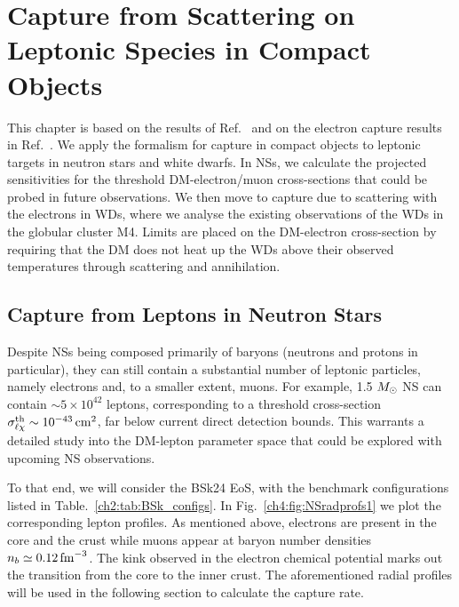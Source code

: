 \graphicspath{{img/capture_leptons/}}

\chapter{Capture from Scattering on Leptonic Species in Compact Objects}
\label{chapter:capture_leptons}

\begin{synopsis}
This chapter is based on the results of Ref.~\cite{Bell:2020lmm_mar_ImprovedTreatmentDark} and on the electron capture results in Ref.~\cite{Bell:2021fye_oct_Improvedtreatmentdark}. We apply the formalism for capture in compact objects to leptonic targets in neutron stars and white dwarfs. In NSs, we calculate the projected sensitivities for the threshold DM-electron/muon cross-sections that could be probed in future observations. We then move to capture due to scattering with the electrons in WDs, where we analyse the existing observations of the WDs in the globular cluster M4. Limits are placed on the DM-electron cross-section by requiring that the DM does not heat up the WDs above their observed temperatures through scattering and annihilation.
\end{synopsis}



\section{Capture from Leptons in Neutron Stars}
\label{ch4:sec:lep_NS}
Despite NSs being composed primarily of baryons (neutrons and protons in particular), they can still contain a substantial number of leptonic particles, namely electrons and, to a smaller extent, muons. For example, 1.5 $M_\odot$ NS can contain $\sim 5\times 10^42$ leptons, corresponding to a threshold cross-section $\sigma^{\rm th}_{\ell\chi}\sim 10^{-43}{\rm \,cm}^2$, far below current direct detection bounds. This warrants a detailed study into the DM-lepton parameter space that could be explored with upcoming NS observations. 

To that end, we will consider the BSk24 EoS, with the benchmark configurations listed in Table.~\ref{ch2:tab:BSk_configs}.
In Fig.~\ref{ch4:fig:NSradprofs1} we plot the corresponding lepton profiles.
As mentioned above, electrons are present in the core and the crust while muons appear at baryon number densities $n_b\simeq 0.12{\rm \,fm}^{-3}$. The kink observed in the electron chemical potential marks out the transition from the core to the inner crust. 
The aforementioned radial profiles will be used in the following section to calculate the capture rate. 

